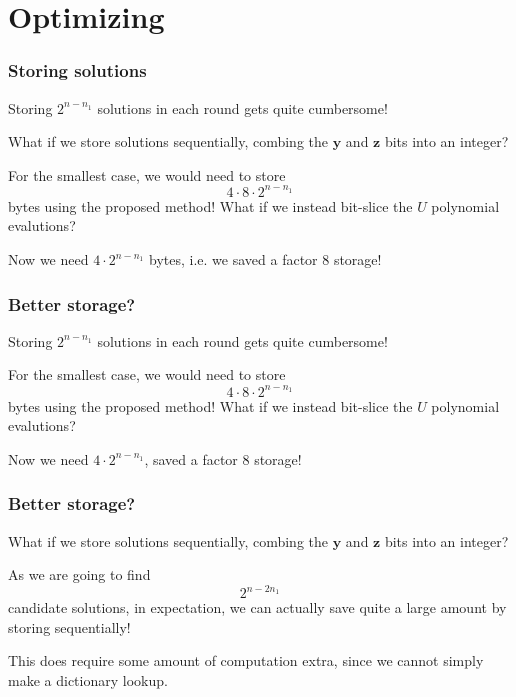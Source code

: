 \documentclass{beamer}
\begin{document}
\section{Optimizing}
    \begin{frame}
        \frametitle{Storing solutions}
        Storing $2^{n - n_1}$ solutions in each round gets quite cumbersome!

        \pause 

        What if we store solutions sequentially, combing the $\mathbf{y}$ and $\mathbf{z}$ bits into an integer?
        
        \pause 

        For the smallest case, we would need to store 
        $$
            4 \cdot 8 \cdot 2^{n - n_1}
        $$
        bytes using the proposed method! What if we instead bit-slice the $U$ polynomial evalutions?

        \pause 

        Now we need $4\cdot 2^{n - n_1}$ bytes, i.e. we saved a factor 8 storage!
    \end{frame}

    \begin{frame}
        \frametitle{Better storage?}
        Storing $2^{n - n_1}$ solutions in each round gets quite cumbersome!

        \pause 

        For the smallest case, we would need to store 
        $$
            4 \cdot 8 \cdot 2^{n - n_1}
        $$
        bytes using the proposed method! What if we instead bit-slice the $U$ polynomial evalutions?

        \pause 

        Now we need $4\cdot 2^{n - n_1}$, saved a factor 8 storage!
    \end{frame}

    \begin{frame}
        \frametitle{Better storage?}
        What if we store solutions sequentially, combing the $\mathbf{y}$ and $\mathbf{z}$ bits into an integer?
        
        \pause 

        As we are going to find 
        $$
            2^{n - 2n_1}
        $$
        candidate solutions, in expectation, we can actually save quite a large amount by storing sequentially!

        This does require some amount of computation extra, since we cannot simply make a dictionary lookup.
    \end{frame}
\end{document}
